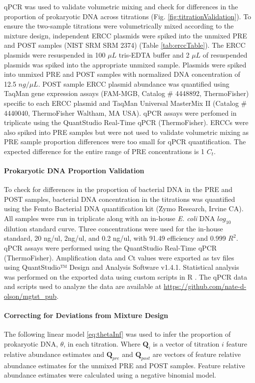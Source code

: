 \documentclass[linenumbers]{bmcart}
\begin{document}
qPCR was used to validate volumetric mixing and check for differences in
the proportion of prokaryotic DNA across titrations
(Fig. \ref{fig:titrationValidation}). To ensure the two-sample titrations
were volumetrically mixed according to the mixture design,
independent ERCC plasmids were spiked into the unmixed PRE and
POST samples \cite{baker2005external} (NIST SRM SRM 2374) (Table
\ref{tab:erccTable}). The ERCC plasmids were resuspended in 100
\(\mu L\) tris-EDTA buffer and 2 \(\mu L\) of resuspended plasmids was
spiked into the appropriate unmixed sample. Plasmids were spiked into
unmixed PRE and POST samples with normalized DNA concentration of
12.5 \(ng/\mu L\). POST sample ERCC plasmid abundance was quantified
using TaqMan gene expression assays (FAM-MGB, Catalog \# 4448892,
ThermoFisher) specific to each ERCC plasmid and TaqMan Universal
MasterMix II (Catalog \# 4440040, ThermoFisher Waltham, MA USA).
qPCR assays were perfomed in triplicate using the QuantStudio
Real-Time qPCR (ThermoFisher). ERCCs were also spiked into PRE
samples but were not used to validate volumetric mixing as PRE sample
proportion differences were too small for qPCR quantification.
The expected difference for the entire range of PRE concentrations
is 1 \(C_t\).

\paragraph*{Prokaryotic DNA Proportion Validation}
To check for differences in the proportion of bacterial DNA in the PRE
and POST samples, bacterial DNA concentration in the titrations was quantified
using the Femto Bacterial DNA quantification kit (Zymo Research, Irvine
CA). All samples were run in triplicate along with an in-house \emph{E.
coli} DNA \(log_{10}\) dilution standard curve. Three concentrations were used
for the in-house standard, 20 ng/ul, 2ng/ul, and 0.2 ng/ul,
with 91.49 efficiency and 0.999 \(R^2\). qPCR assays were
performed using the QuantStudio Real-Time qPCR (ThermoFisher).
Amplification data and Ct values were exported as tsv files using
QuantStudio™ Design and Analysis Software v1.4.1. Statistical analysis
was performed on the exported data using custom scripts in R \cite{R}.
The qPCR data and scripts used to analyze the data are available at
\url{https://github.com/nate-d-olson/mgtst_pub}.

\paragraph*{Correcting for Deviations from Mixture Design}
The following linear model \eqref{eq:thetaInf} was used to infer the
proportion of prokaryotic DNA, \(\theta\), in each titration. Where
\(\textbf{Q}_{i}\) is a vector of titration \(i\) feature relative
abundance estimates and \(\textbf{Q}_{pre}\) and \(\textbf{Q}_{post}\)
are vectors of feature relative abundance estimates for the unmixed PRE
and POST samples. Feature relative abundance estimates were calculated
using a negative binomial model.
\end{document}
